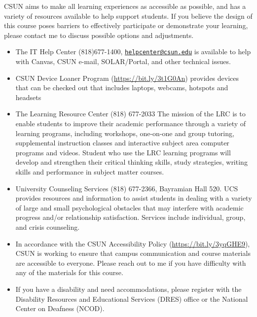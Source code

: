 \documentclass[11pt,]{article}
\providecommand{\tightlist}{%
  \setlength{\itemsep}{0pt}\setlength{\parskip}{0pt}}
\begin{document}
CSUN aims to make all learning experiences as accessible as possible,
and has a variety of resources available to help support students. If
you believe the design of this course poses barriers to effectively
participate or demonstrate your learning, please contact me to discuss
possible options and adjustments.

\begin{itemize}
\tightlist
\item
  The IT Help Center (818)677-1400,
  \href{mailto:helpcenter@csun.edu}{\nolinkurl{helpcenter@csun.edu}} is
  available to help with Canvas, CSUN e-mail, SOLAR/Portal, and other
  technical issues.\\
\item
  CSUN Device Loaner Program (\url{https://bit.ly/3t1G0An}) provides
  devices that can be checked out that includes laptops, webcams,
  hotspots and headsets
\item
  The Learning Resource Center (818) 677-2033 The mission of the LRC is
  to enable students to improve their academic performance through a
  variety of learning programs, including workshops, one-on-one and
  group tutoring, supplemental instruction classes and interactive
  subject area computer programs and videos. Student who use the LRC
  learning programs will develop and strengthen their critical thinking
  skills, study strategies, writing skills and performance in subject
  matter courses.
\item
  University Counseling Services (818) 677-2366, Bayramian Hall 520. UCS
  provides resources and information to assist students in dealing with
  a variety of large and small psychological obstacles that may
  interfere with academic progress and/or relationship satisfaction.
  Services include individual, group, and crisis counseling.
\item
  In accordance with the CSUN Accessibility Policy
  (\url{https://bit.ly/3yqGHE9}), CSUN is working to ensure that campus
  communication and course materials are accessible to everyone. Please
  reach out to me if you have difficulty with any of the materials for
  this course.
\item
  If you have a disability and need accommodations, please register with
  the Disability Resources and Educational Services (DRES) office or the
  National Center on Deafness (NCOD).


\end{itemize}
\end{document}
